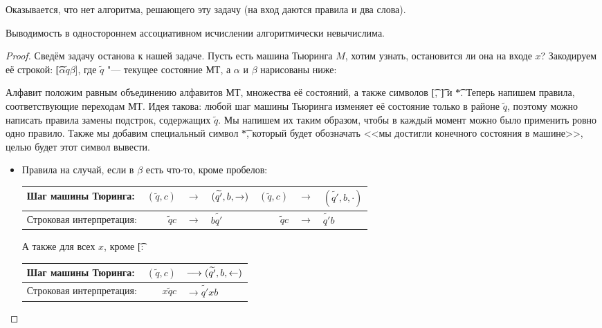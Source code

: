 Оказывается, что нет алгоритма, решающего эту задачу (на вход даются правила и два слова).

\begin{theorem}
	Выводимость в одностороннем ассоциативном исчислении алгоритмически невычислима.
\end{theorem}
\begin{proof}
	Сведём задачу останова к нашей задаче.
	Пусть есть машина Тьюринга $M$, хотим узнать, остановится ли она на входе $x$?
	Закодируем её строкой:
	\t{[$\alpha \widetilde{q} \beta$]}, где $\widetilde{q}$ "--- текущее состояние МТ, а $\alpha$ и $\beta$ нарисованы ниже:
	

	Алфавит положим равным объединению алфавитов МТ, множества её состояний, а также символов \t{[}, \t{]} и \t{*}.
	Теперь напишем правила, соответствующие переходам МТ.
	Идея такова: любой шаг машины Тьюринга изменяет её состояние только в районе $\widetilde q$, поэтому можно написать
	правила замены подстрок, содержащих $\widetilde q$.
	Мы напишем их таким образом, чтобы в каждый момент можно было применить ровно одно правило.
	Также мы добавим специальный символ \t{*}, который будет обозначать <<мы достигли конечного состояния в машине>>,
	целью будет этот символ вывести.
	\begin{itemize}
	\item
		Правила на случай, если в $\beta$ есть что-то, кроме пробелов:

		\begin{tabular}{|l|rcl|rcl|}
		\hline
			Шаг машины Тюринга: &
			$(\widetilde{q}, c)$ & $\longrightarrow$ & $(\widetilde{q'}, b, \rightarrow)$ &
			$(\widetilde{q}, c)$ & $\longrightarrow$ & $(\widetilde{q'}, b, \cdot)$
		\\\hline
			Строковая интерпретация: &
			$\widetilde{q}c$ & $\longrightarrow$ & $b\widetilde{q'}$ &
			$\widetilde{q}c$ & $\longrightarrow$ & $\widetilde{q'}b$
		\\\hline
		\end{tabular}

		А также для всех $x$, кроме \t{[}:

		\begin{tabular}{|l|rl|}
		\hline
			Шаг машины Тюринга: &
			$(\widetilde{q}, c)$ & $\longrightarrow (\widetilde{q'}, b, \leftarrow)$
		\\\hline
			Строковая интерпретация: &
			$x\widetilde{q}c$ & $\longrightarrow \widetilde{q'}xb$
		\\\hline
		\end{tabular}


\end{itemize}
\end{proof}
